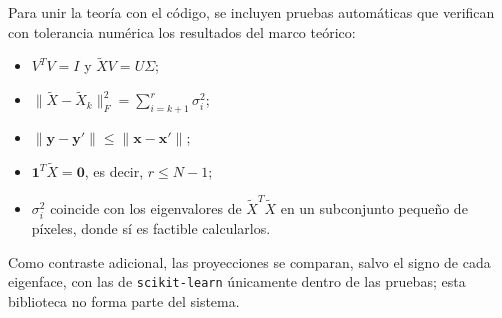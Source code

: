 Para unir la teoría con el código, se incluyen pruebas automáticas que verifican con
tolerancia numérica los resultados del marco teórico:
\begin{itemize}
    \item $V^TV = I$ y $\tilde{X}V = U\Sigma$;
    \item $\|\tilde{X} - \tilde{X}_k\|_F^2 = \sum_{i=k+1}^{r}\sigma_i^2$;
    \item $\|\mathbf{y} - \mathbf{y}'\| \leq \|\mathbf{x} - \mathbf{x}'\|$;
    \item $\mathbf{1}^T\tilde{X} = \mathbf{0}$, es decir, $r \leq N-1$;
    \item $\sigma_i^2$ coincide con los eigenvalores de $\tilde{X}^T\tilde{X}$ en un
    subconjunto pequeño de píxeles, donde sí es factible calcularlos.
\end{itemize}
Como contraste adicional, las proyecciones se comparan, salvo el signo de cada eigenface,
con las de \texttt{scikit-learn} únicamente dentro de las pruebas; esta biblioteca no forma
parte del sistema.